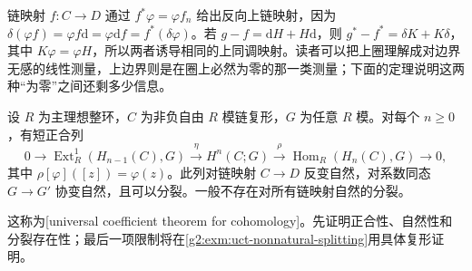 链映射 \(f:C\to D\) 通过 \(f^*\varphi=\varphi f_n\) 给出反向上链映射，因为 \(\delta(\varphi f)=\varphi f\mathrm{d}=\varphi\mathrm{d}f=f^*(\delta\varphi)\)。若 \(g-f=\mathrm{d}H+H\mathrm{d}\)，则 \(g^*-f^*=\delta K+K\delta\)，其中 \(K\varphi=\varphi H\)，所以两者诱导相同的上同调映射。读者可以把上圈理解成对边界无感的线性测量，上边界则是在圈上必然为零的那一类测量；下面的定理说明这两种“为零”之间还剩多少信息。

\begin{theorem}[上同调万有系数定理]\label{g2:thm:uct-cohomology}
	设 \(R\) 为主理想整环，\(C\) 为非负自由 \(R\) 模链复形，\(G\) 为任意 \(R\) 模。对每个 \(n\ge0\)，有短正合列
	\begin{equation}\label{g2:eq:uct-cohomology}
		0\longrightarrow\operatorname{Ext}_R^1(H_{n-1}(C),G)\xrightarrow{\eta}H^n(C;G)\xrightarrow{\rho}\operatorname{Hom}_R(H_n(C),G)\longrightarrow0,
	\end{equation}
	其中 \(\rho[\varphi]([z])=\varphi(z)\)。此列对链映射 \(C\to D\) 反变自然，对系数同态 \(G\to G'\) 协变自然，且可以分裂。一般不存在对所有链映射自然的分裂。
\end{theorem}

这称为[universal coefficient theorem for cohomology]。先证明正合性、自然性和分裂存在性；最后一项限制将在\cref{g2:exm:uct-nonnatural-splitting}用具体复形证明。

